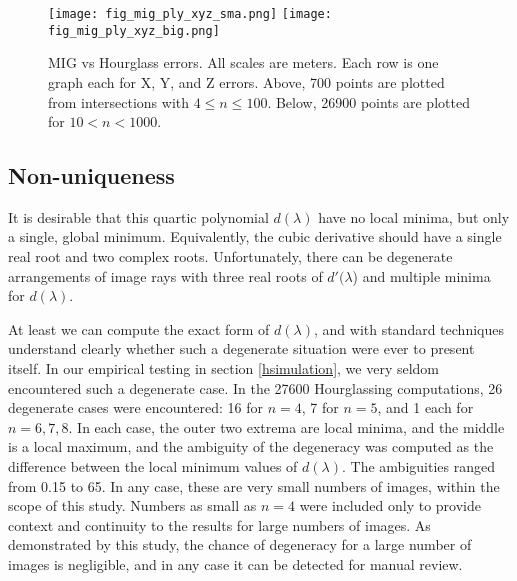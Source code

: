 \documentclass[10pt]{amsart}
\begin{document}
\begin{figure}
\texttt{[image: fig\_mig\_ply\_xyz\_sma.png]}
\texttt{[image: fig\_mig\_ply\_xyz\_big.png]}
\caption{\label{fig:mig_vs_hourglass}MIG vs Hourglass errors. All scales are
  meters. Each row is one graph each for X, Y, and Z errors. Above, 700 points
  are plotted from intersections with $4\le n\le 100$. Below, 26900 points are
  plotted for $10<n<1000$.}
\end{figure}


\subsection{Non-uniqueness}
It is desirable that this quartic polynomial $d(\lambda)$ have no
local minima, but only a single, global minimum. Equivalently, the
cubic derivative should have a single real root and two complex
roots. Unfortunately, there can be degenerate arrangements of image
rays with three real roots of $d'(\lambda$) and multiple minima for
$d(\lambda)$.


At least we can compute the exact form of $d(\lambda)$, and with standard
techniques understand clearly whether such a degenerate situation were ever to
present itself. In our empirical testing in section \ref{hsimulation}, we very
seldom encountered such a degenerate case. In the 27600 Hourglassing
computations, 26 degenerate cases were encountered: 16 for $n=4$, 7 for $n=5$,
and 1 each for $n=6,7,8$. In each case, the outer two extrema are local minima,
and the middle is a local maximum, and the ambiguity of the degeneracy was
computed as the difference between the local minimum values of $d(\lambda)$. The
ambiguities ranged from 0.15 to 65. In any case, these are very small numbers of
images, within the scope of this study. Numbers as small as $n=4$ were included
only to provide context and continuity to the results for large numbers of
images. As demonstrated by this study, the chance of degeneracy for a large
number of images is negligible, and in any case it can be detected for manual
review.
\end{document}
